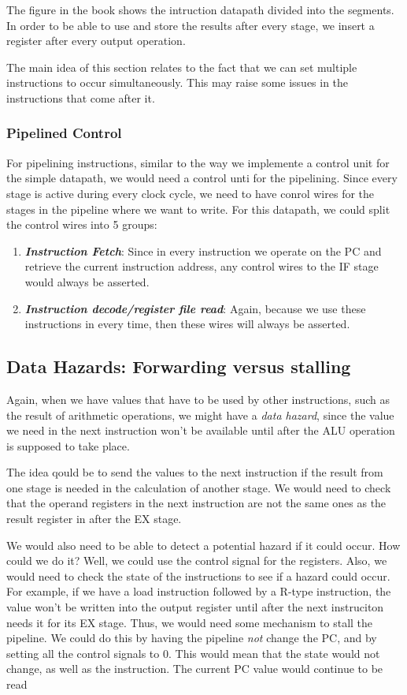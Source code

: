 \documentclass{article}
\begin{document}
The figure in the book shows the intruction datapath divided into the segments. In order to be
able to use and store the results after every stage, we insert a register after every output 
operation.

The main idea of this section relates to the fact that we can set multiple instructions to occur
simultaneously. This may raise some issues in the instructions that come after it.
\subsubsection{Pipelined Control}
For pipelining instructions, similar to the way we implemente a control unit for the simple 
datapath, we would need a control unti for the pipelining. Since every stage is active during 
every clock cycle, we need to have conrol wires for the stages in the pipeline where we want 
to write. For this datapath, we could split the control wires into 5 groups:
\begin{enumerate}
		\item{\textit{\textbf{Instruction Fetch}}}: Since in every instruction we operate on
				the PC and retrieve the current instruction address, any control wires to the IF
				stage would always be asserted.
		\item{\textbf{\textit{Instruction decode/register file read}}}: Again, because we use these
				instructions in every time, then these wires will always be asserted.
\end{enumerate}
\newpage
\subsection{Data Hazards: Forwarding versus stalling}
Again, when we have values that have to be used by other instructions, such as the result of
arithmetic operations, we might have a \textit{data hazard}, since the value we need in the 
next instruction won't be available until after the ALU operation is supposed to take place.

The idea qould be to send the values to the next instruction if the result from one stage is needed 
in the calculation of another stage. We would need to check that the operand registers in the next
instruction are not the same ones as the result register in after the EX stage.

We would also need to be able to detect a potential hazard if it could occur. How could we do it? 
Well, we could use the control signal for the registers. Also, we would need to check the state 
of the instructions to see if a hazard could occur. For example, if we have a load instruction 
followed by a R-type instruction, the value won't be written into the output register until after the 
next instruciton needs it for its EX stage. Thus, we would need some mechanism to stall the 
pipeline. We could do this by having the pipeline \textit{not} change the PC, and by setting all the
control signals to 0. This would mean that the state would not change, as well as the instruction.
The current PC value would continue to be read 
\end{document}
